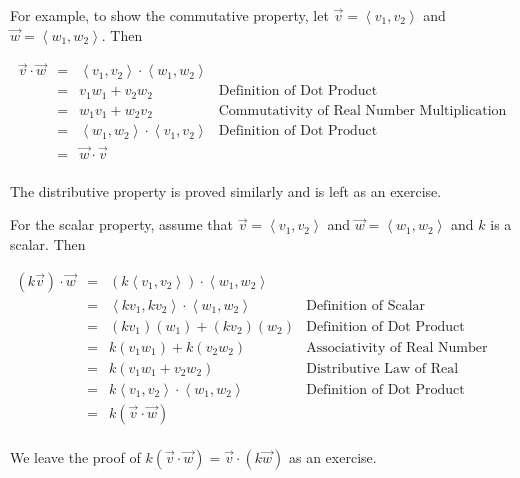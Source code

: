 \documentclass{ximera}
\begin{document}
 

For example, to show the commutative property,  let $\overrightarrow{v} = \left<v_1,v_2\right>$ and $\overrightarrow{w} = \left<w_1,w_2\right>$.  Then

\[ \begin{array}{rcll}

\overrightarrow{v} \cdot \overrightarrow{w} & = & \left<v_1,v_2\right>  \cdot \left<w_1,w_2\right>  & \\ 
 & = & v_1w_1 + v_2w_2 & \text{Definition of Dot Product} \\ 
& = & w_1v_1 + w_2v_2 & \text{Commutativity of Real Number Multiplication} \\ 
 & = & \left<w_1,w_2\right>  \cdot  \left<v_1,v_2\right>  & \text{Definition of Dot Product} \\ 
 & = & \overrightarrow{w} \cdot \overrightarrow{v} & \\ \end{array} \]

The distributive property is proved similarly and is left as an exercise.

 

For the scalar property, assume that $\overrightarrow{v} = \left<v_1,v_2\right>$ and $\overrightarrow{w} = \left<w_1,w_2\right>$ and $k$ is a scalar.  Then

\[ \begin{array}{rcll}

(k\overrightarrow{v}) \cdot \overrightarrow{w} & = & \left(k \left<v_1,v_2\right> \right) \cdot \left<w_1,w_2\right> & \\ 
 & = &  \left<kv_1,kv_2\right>  \cdot \left<w_1,w_2\right> & \text{Definition of Scalar Multiplication} \\ 
	 & = & (kv_1)(w_1) + (kv_2)(w_2) & \text{Definition of Dot Product} \\ 
 & = & k(v_1w_1) + k(v_2w_2) & \text{Associativity of Real Number Multiplication} \\ 
 & = & k(v_1w_1 + v_2w_2) & \text{Distributive Law of Real Numbers} \\ 
 & = & k \left<v_1,v_2\right>  \cdot \left<w_1,w_2\right> & \text{Definition of Dot Product} \\ 
 & = & k (\overrightarrow{v} \cdot \overrightarrow{w}) & \\ \end{array} \]

We leave the proof of $k(\overrightarrow{v} \cdot \overrightarrow{w}) = \overrightarrow{v} \cdot (k \overrightarrow{w})$ as an exercise.
\end{document}
